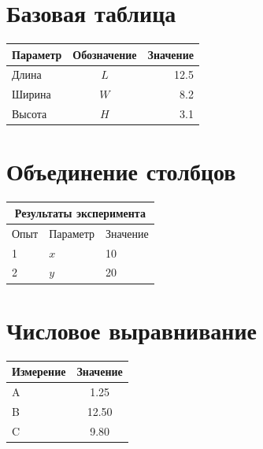 \documentclass[a4paper,12pt]{article}
\begin{document}
\section{Базовая таблица}
\begin{center}
\begin{tabular}{lcr}
\toprule
Параметр & Обозначение & Значение\\
\midrule
Длина & $L$ & 12.5\\
Ширина & $W$ & 8.2\\
Высота & $H$ & 3.1\\
\bottomrule
\end{tabular}
\end{center}

\section{Объединение столбцов}
\begin{center}
\begin{tabular}{lll}
\toprule
\multicolumn{3}{c}{Результаты эксперимента}\\
\midrule
Опыт & Параметр & Значение\\
1 & $x$ & 10\\
2 & $y$ & 20\\
\bottomrule
\end{tabular}
\end{center}

\section{Числовое выравнивание}
\begin{center}
\begin{tabular}{l S[table-format=2.2]}
\toprule
Измерение & {Значение}\\
\midrule
A & 1.25\\
B & 12.50\\
C & 9.80\\
\bottomrule
\end{tabular}
\end{center}
\end{document}
